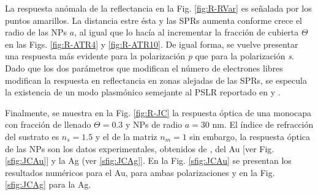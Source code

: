 \documentclass[letterpaper,11pt] {article}
\begin{document}
La respuesta anómala de la reflectancia en la Fig.  \ref{fig:R-RVar} es señalada por los puntos amarillos.  La distancia estre ésta y las SPRs aumenta conforme crece el radio de las NPs $a$, al igual que lo hacía al incrementar la fracción de cubierta $\Theta$ en las Figs.   \ref{fig:R-ATR4} y \ref{fig:R-ATR10}.  De igual forma, se vuelve presentar una respuesta más evidente para la polarización \emph{p} que para la polarización \emph{s}.  Dado que los dos parámetros que modifican el número de electrones libres modifican la respuesta en reflectancia en zonas alejadas de las SPRs, se especula la existencia de un modo plasmónico semejante al PSLR reportado en  \cite{kabashin2009plasmonic} y \cite{danilov2018ultra}. 

Finalmente, se muestra en la Fig.  \ref{fig:R-JC} la respuesta óptica de una monocapa con fracción de llenado  $\Theta=0. 3$ y NPs de radio $a=30$ nm.  El índice de refracción del sustrato es $n_s=1. 5$ y el de la matriz $n_m=1$ sin embargo, la respuesta óptica de las NPs son los datos experimentales, obtenidos de \cite{johnson1972contants}, del Au [ver Fig.  \ref{sfig:JCAu}] y la Ag (ver \ref{sfig:JCAg}].  En la Fig.  \ref{sfig:JCAu} se presentan los resultados numéricos para el Au, para ambas polarizaciones y en la Fig.  \ref{sfig:JCAg} para la Ag. 
\end{document}
